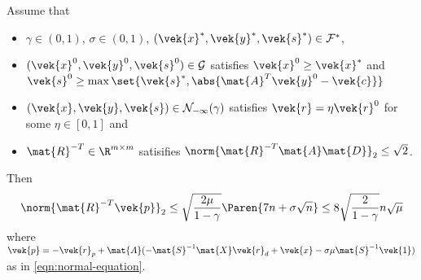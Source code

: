 \begin{lemma}\label{thm:initial-residual-bound}
  Assume that
  \begin{itemize}
    \item \(\gamma \in (0, 1)\), \(\sigma \in (0, 1)\), \((\vek{x}^*, \vek{y}^*, \vek{s}^*) \in \mathcal{F}^*\),
    \item \((\vek{x}^0, \vek{y}^0, \vek{s}^0) \in \mathcal{G}\) satisfies \(\vek{x}^0 \geq \vek{x}^*\) and \(\vek{s}^0 \geq \max\set{\vek{s}^*, \abs{\mat{A}^T\vek{y}^0 - \vek{c}}}\)
    \item \((\vek{x}, \vek{y}, \vek{s}) \in \mathcal{N}_{-\infty}(\gamma)\) satisfies \(\vek{r} = \eta \vek{r}^0\) for some \(\eta \in [0, 1]\) and
    \item \(\mat{R}^{-T} \in \R^{m \times m}\) satisifies \(\norm{\mat{R}^{-T}\mat{A}\mat{D}}_2 \leq \sqrt{2}\).
  \end{itemize}
  Then
  \[ \norm{\mat{R}^{-T} \vek{p}}_2 \leq \sqrt{\frac{2 \mu}{1 - \gamma}} \Paren{7n + \sigma \sqrt{n}} \leq 8 \sqrt{\frac{2}{1 - \gamma}} n \sqrt{\mu} \]
  where \(\vek{p} = -\vek{r}_p + \mat{A} ( -\mat{S}^{-1} \mat{X} \vek{r}_d + \vek{x} - \sigma \mu \mat{S}^{-1} \vek{1} )\) as in \cref{eqn:normal-equation}.
\end{lemma}

